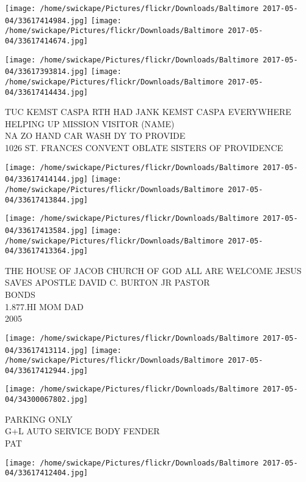 \documentclass[10pt,letterpaper]{article}
\begin{document}
\texttt{[image: /home/swickape/Pictures/flickr/Downloads/Baltimore 2017-05-04/33617414984.jpg]}
\texttt{[image: /home/swickape/Pictures/flickr/Downloads/Baltimore 2017-05-04/33617414674.jpg]}

\texttt{[image: /home/swickape/Pictures/flickr/Downloads/Baltimore 2017-05-04/33617393814.jpg]}
\texttt{[image: /home/swickape/Pictures/flickr/Downloads/Baltimore 2017-05-04/33617414434.jpg]}

TUC KEMST CASPA RTH HAD JANK KEMST CASPA EVERYWHERE\\
HELPING UP MISSION VISITOR (NAME)\\
NA ZO HAND CAR WASH DY TO PROVIDE\\
1026 ST. FRANCES CONVENT OBLATE SISTERS OF PROVIDENCE\\
\pagebreak

\texttt{[image: /home/swickape/Pictures/flickr/Downloads/Baltimore 2017-05-04/33617414144.jpg]}
\texttt{[image: /home/swickape/Pictures/flickr/Downloads/Baltimore 2017-05-04/33617413844.jpg]}

\texttt{[image: /home/swickape/Pictures/flickr/Downloads/Baltimore 2017-05-04/33617413584.jpg]}
\texttt{[image: /home/swickape/Pictures/flickr/Downloads/Baltimore 2017-05-04/33617413364.jpg]}

THE HOUSE OF JACOB CHURCH OF GOD ALL ARE WELCOME JESUS SAVES APOSTLE DAVID C. BURTON JR PASTOR\\
BONDS\\
1.877.HI MOM DAD\\
2005\\
\pagebreak

\texttt{[image: /home/swickape/Pictures/flickr/Downloads/Baltimore 2017-05-04/33617413114.jpg]}
\texttt{[image: /home/swickape/Pictures/flickr/Downloads/Baltimore 2017-05-04/33617412944.jpg]}

\vspace{0.25in}
\texttt{[image: /home/swickape/Pictures/flickr/Downloads/Baltimore 2017-05-04/34300067802.jpg]}

PARKING ONLY\\
G+L AUTO SERVICE BODY FENDER\\
PAT\\
\pagebreak

\texttt{[image: /home/swickape/Pictures/flickr/Downloads/Baltimore 2017-05-04/33617412404.jpg]}
\end{document}
